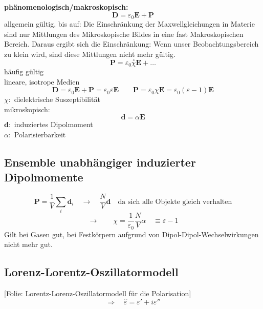 \documentclass[titlepage,11pt,a4paper,ngerman]{report}
\newcommand{\tx}[1]{\textrm{#1}}
\newcommand{\folie}[1]{\color{gray}[Folie: #1]\color{black}}
\renewcommand{\vec}[1]{\boldsymbol{#1}}
\newcommand{\lcom}[1]{\color{MidnightBlue}#1\color{black}}
\renewcommand{\epsilon}{\varepsilon}
\begin{document}
\textbf{phänomenologisch/makroskopisch:}
\begin{equation*}
\vec{D} = \epsilon_0 \vec{E} + \vec{P}
\end{equation*}
allgemein gültig, bis auf:
\lcom{Die Einschränkung der Maxwellgleichungen in Materie sind nur Mittlungen des Mikroskopische Bildes in eine fast Makroskopischen Bereich. Daraus ergibt sich die Einschränkung: Wenn unser Beobachtungsbereich zu klein wird, sind diese Mittlungen nicht mehr gültig.}
\begin{equation*}
\vec{P} = \epsilon_0 \overset{\circ}{\chi} \vec{E} + \dots
\end{equation*}
häufig gültig\\[5pt]
lineare, isotrope Medien
\begin{equation*}
\vec{D} = \epsilon_0 \vec{E} + \vec{P} = \epsilon_0 \epsilon \vec{E} \qquad \vec{P} = \epsilon_0 \chi \vec{E} = \epsilon_0 (\epsilon - 1) \vec{E}
\end{equation*}
$ \chi : $ dielektrische Suszeptibilität\\[5pt]
mikroskopisch:
\begin{equation*}
\vec{d} = \alpha \vec{E}
\end{equation*}
$ \vec{d} : $ induziertes Dipolmoment\\
$ \alpha : $ Polarisierbarkeit

\subsection{Ensemble unabhängiger induzierter Dipolmomente}

\begin{equation*}
\vec{P} = \frac{1}{V} \sum_i \vec{d}_i \quad \rightarrow \quad \frac{N}{V} \vec{d} \quad \tx{da sich alle Objekte gleich verhalten}
\end{equation*}
\begin{equation*}
\rightarrow \qquad \chi = \frac{1}{\epsilon_0} \frac{N}{V} \alpha \quad \equiv \epsilon - 1
\end{equation*}
\lcom{Gilt bei Gasen gut, bei Festkörpern aufgrund von Dipol-Dipol-Wechselwirkungen nicht mehr gut.}

\subsection{Lorenz-Lorentz-Oszillatormodell}

\folie{Lorentz-Lorenz-Oszillatormodell für die Polarisation}
\begin{equation*}
\Rightarrow \quad \hat{\epsilon} = \epsilon' + i \epsilon''
\end{equation*}
\end{document}
